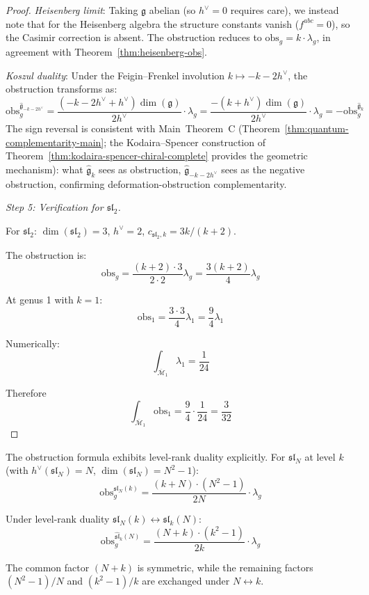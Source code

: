 \begin{proof}
\emph{Heisenberg limit}: Taking $\mathfrak{g}$ abelian (so $h^\vee = 0$ requires care),
we instead note that for the Heisenberg algebra the structure constants vanish ($f^{abc} = 0$),
so the Casimir correction is absent.  The obstruction reduces to
$\text{obs}_g = k \cdot \lambda_g$, in agreement with Theorem~\ref{thm:heisenberg-obs}.

\emph{Koszul duality}: Under the Feigin--Frenkel involution $k \mapsto -k-2h^\vee$, the
obstruction transforms as:
\[\text{obs}_g^{\widehat{\mathfrak{g}}_{-k-2h^\vee}} =
\frac{(-k-2h^\vee+h^\vee)\dim(\mathfrak{g})}{2h^\vee} \cdot \lambda_g
= \frac{-(k+h^\vee)\dim(\mathfrak{g})}{2h^\vee} \cdot \lambda_g
= -\text{obs}_g^{\widehat{\mathfrak{g}}_k}\]
The sign reversal is consistent with Main~Theorem~C (Theorem~\ref{thm:quantum-complementarity-main}; the Kodaira--Spencer construction of Theorem~\ref{thm:kodaira-spencer-chiral-complete} provides the geometric mechanism):
what $\widehat{\mathfrak{g}}_k$ sees as obstruction, $\widehat{\mathfrak{g}}_{-k-2h^\vee}$
sees as the negative obstruction, confirming deformation-obstruction complementarity.

\emph{Step 5: Verification for $\mathfrak{sl}_2$.}

For $\mathfrak{sl}_2$: $\dim(\mathfrak{sl}_2) = 3$, $h^\vee = 2$,
$c_{\mathfrak{sl}_2, k} = 3k/(k+2)$.

The obstruction is:
\[\text{obs}_g = \frac{(k+2) \cdot 3}{2 \cdot 2} \lambda_g = \frac{3(k+2)}{4} \lambda_g\]

At genus 1 with $k=1$:
\[\text{obs}_1 = \frac{3 \cdot 3}{4} \lambda_1 = \frac{9}{4} \lambda_1\]

Numerically:
\[\int_{\overline{\mathcal{M}}_1} \lambda_1 = \frac{1}{24}\]

Therefore
\[\int_{\overline{\mathcal{M}}_1} \text{obs}_1 = \frac{9}{4} \cdot \frac{1}{24}
= \frac{3}{32}\]
\end{proof}

\begin{remark}\label{rem:level-rank-obstruction}
The obstruction formula exhibits level-rank duality explicitly. For $\mathfrak{sl}_N$
at level $k$ (with $h^\vee(\mathfrak{sl}_N) = N$, $\dim(\mathfrak{sl}_N) = N^2-1$):
\[\text{obs}_g^{\widehat{\mathfrak{sl}}_N(k)} =
\frac{(k+N) \cdot (N^2-1)}{2N} \cdot \lambda_g\]

Under level-rank duality $\mathfrak{sl}_N(k) \leftrightarrow \mathfrak{sl}_k(N)$:
\[\text{obs}_g^{\widehat{\mathfrak{sl}}_k(N)} =
\frac{(N+k) \cdot (k^2-1)}{2k} \cdot \lambda_g\]

The common factor $(N+k)$ is symmetric, while the remaining factors
$(N^2-1)/N$ and $(k^2-1)/k$ are exchanged under $N \leftrightarrow k$.
\end{remark}

